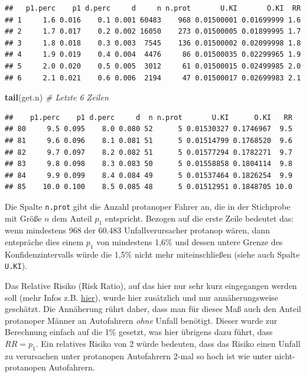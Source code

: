 \documentclass[
]{article}
\newenvironment{Shaded}{\begin{snugshade}}{\end{snugshade}}
\newcommand{\CommentTok}[1]{\textcolor[rgb]{0.56,0.35,0.01}{\textit{#1}}}
\newcommand{\KeywordTok}[1]{\textcolor[rgb]{0.13,0.29,0.53}{\textbf{#1}}}
\newcommand{\NormalTok}[1]{#1}
\begin{document}
\begin{verbatim}
##   p1.perc    p1 d.perc     d     n n.prot       U.KI       O.KI  RR
## 1     1.6 0.016    0.1 0.001 60483    968 0.01500001 0.01699999 1.6
## 2     1.7 0.017    0.2 0.002 16050    273 0.01500005 0.01899995 1.7
## 3     1.8 0.018    0.3 0.003  7545    136 0.01500002 0.02099998 1.8
## 4     1.9 0.019    0.4 0.004  4476     86 0.01500035 0.02299965 1.9
## 5     2.0 0.020    0.5 0.005  3012     61 0.01500015 0.02499985 2.0
## 6     2.1 0.021    0.6 0.006  2194     47 0.01500017 0.02699983 2.1
\end{verbatim}

\begin{Shaded}
\begin{Highlighting}[]
\KeywordTok{tail}\NormalTok{(get.n) }\CommentTok{# Letzte 6 Zeilen}
\end{Highlighting}
\end{Shaded}

\begin{verbatim}
##    p1.perc    p1 d.perc     d  n n.prot       U.KI      O.KI   RR
## 80     9.5 0.095    8.0 0.080 52      5 0.01530327 0.1746967  9.5
## 81     9.6 0.096    8.1 0.081 51      5 0.01514799 0.1768520  9.6
## 82     9.7 0.097    8.2 0.082 51      5 0.01577294 0.1782271  9.7
## 83     9.8 0.098    8.3 0.083 50      5 0.01558858 0.1804114  9.8
## 84     9.9 0.099    8.4 0.084 49      5 0.01537464 0.1826254  9.9
## 85    10.0 0.100    8.5 0.085 48      5 0.01512951 0.1848705 10.0
\end{verbatim}

Die Spalte \texttt{n.prot} gibt die Anzahl protanoper Fahrer an, die in
der Stichprobe mit Größe \(n\) dem Anteil \(p_1\) entspricht. Bezogen
auf die erste Zeile bedeutet das: wenn mindestens 968 der 60.483
Unfallverursacher protanop wären, dann entspräche dies einem \(p_1\) von
mindestens 1,6\% und dessen untere Grenze des Konfidenzintervalls würde
die 1,5\% nicht mehr miteinschließen (siehe auch Spalte \texttt{U.KI}).

Das Relative Risiko (Risk Ratio), auf das hier nur sehr kurz eingegangen
werden soll (mehr Infos z.B.
\href{https://www.wikiwand.com/de/Relatives_Risiko}{hier}), wurde hier
zusätzlich und nur annäherungsweise geschätzt. Die Annäherung rührt
daher, dass man für dieses Maß auch den Anteil protanoper Männer an
Autofahrern \emph{ohne} Unfall benötigt. Dieser wurde zur Berechnung
einfach auf die 1\% gesetzt, was hier übrigens dazu führt, dass
\(RR=p_1\). Ein relatives Risiko von 2 würde bedeuten, dass das Risiko
einen Unfall zu verursachen unter protanopen Autofahrern 2-mal so hoch
ist wie unter nicht-protanopen Autofahrern.
\end{document}
